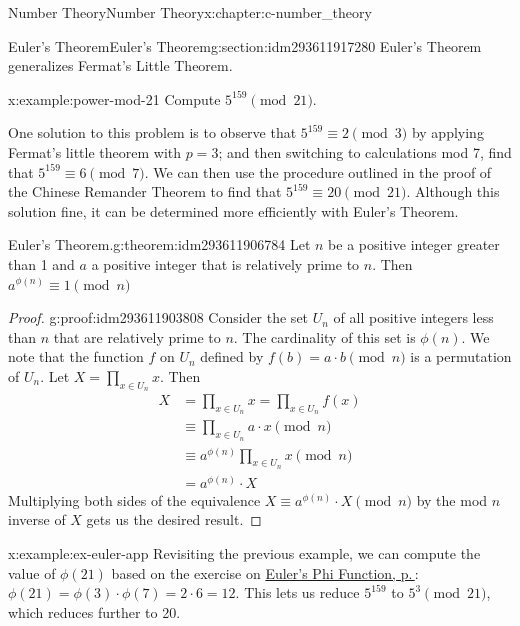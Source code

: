 \documentclass[twoside,10pt,]{book}
\numberwithin{equation}{section}
\begin{document}
\begin{chapterptx}{Number Theory}{}{Number Theory}{}{}{x:chapter:c-number_theory}
\typeout{************************************************}
%
\begin{sectionptx}{Euler's Theorem}{}{Euler's Theorem}{}{}{g:section:idm293611917280}
Euler's Theorem generalizes Fermat's Little Theorem.%
\begin{example}{}{x:example:power-mod-21}%
Compute \(5^{159} \pmod{21}\).%
\par
One solution to this problem is to observe that \(5^{159}\equiv 2 \pmod{3}\)  by applying Fermat's little theorem with \(p=3\); and then switching to calculations mod 7, find that \(5^{159}\equiv 6 \pmod{7}\).  We can then use the procedure outlined in the proof of the Chinese Remander Theorem to find that \(5^{159}\equiv 20 \pmod{21}\). Although this solution fine, it can be determined more efficiently with Euler's Theorem.%
\end{example}
\begin{theorem}{Euler's Theorem.}{}{g:theorem:idm293611906784}%
%
Let \(n\) be a positive integer greater than 1 and \(a\) a positive integer that is relatively prime to \(n\).  Then  \(a^{\phi(n)} \equiv 1 \pmod{n}\)%
\end{theorem}
\begin{proof}{}{g:proof:idm293611903808}
Consider the set \(U_n\) of all positive integers less than \(n\) that are relatively prime to \(n\). The cardinality of this set is \(\phi(n)\).  We note that the function \(f\) on \(U_n\) defined by \(f(b) = a \cdot b \pmod{n}\) is a permutation of \(U_n\). Let \(X=\prod_{x \in U_n} x\). Then%
\begin{equation*}
\begin{split}
X  &= \prod_{x \in U_n} x =  \prod_{x \in U_n} f(x) \\
&\equiv  \prod_{x \in U_n} a\cdot x \pmod{n} \\
&\equiv  a^{\phi(n)} \prod_{x \in U_n}  x \pmod{n} \\
& = a^{\phi(n)} \cdot X
\end{split}
\end{equation*}
Multiplying both sides of the equivalence \(X \equiv a^{\phi(n)} \cdot X \pmod{n}\) by the mod \(n\) inverse of \(X\) gets us the desired result.%
\end{proof}
\begin{example}{}{x:example:ex-euler-app}%
Revisiting the previous example, we can compute the value of \(\phi(21)\) based on the exercise on \hyperlink{x:exercise:exercise-euler-phi}{Euler's Phi Function, p.\,\pageref{x:exercise:exercise-euler-phi}}:  \(\phi(21)=\phi(3)\cdot\phi(7)=2 \cdot 6 = 12\).  This lets us reduce \(5^{159}\) to \(5^{3} \pmod{21}\), which reduces further to 20.%

\end{example}
\end{sectionptx}
\end{chapterptx}
\end{document}
